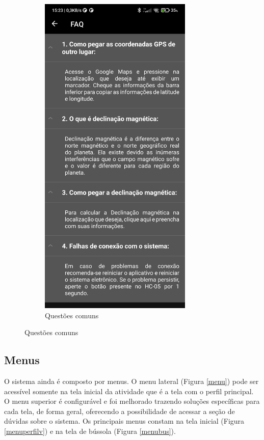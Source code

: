 \begin{figure}[!htb]
\begin{subfigure}[b]{0.4\textwidth}
		\includegraphics[width=0.8\textwidth]{figuras/desAplicativo/faq}
		\caption{Questões comuns}
		\label{faq}
	\end{subfigure}
\end{figure}

\subsection{Menus}

O sistema ainda é composto por menus. O menu lateral (Figura \ref{menu}) pode ser acessível somente na tela inicial da atividade que é a tela com o perfil principal. O menu superior é configurável e foi melhorado trazendo soluções específicas para cada tela, de forma geral, oferecendo a possibilidade de acessar a seção de dúvidas sobre o sistema. Os principais menus constam na tela inicial (Figura \ref{menuperfilv}) e na tela de bússola (Figura \ref{menubus}).

